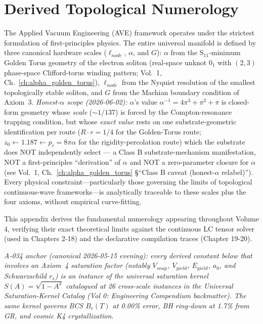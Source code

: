 \chapter{Derived Topological Numerology}
\label{app:derived_topological_numerology}

The Applied Vacuum Engineering (AVE) framework operates under the strictest formulation of first-principles physics. The entire universal manifold is defined by three canonical hardware scales ($\ell_{node}$, $\alpha$, and $G$): $\alpha$ from the S$_{11}$-minimum Golden Torus geometry of the electron soliton (real-space unknot $0_1$ with $(2,3)$ phase-space Clifford-torus winding pattern; Vol.~1, Ch.~\ref{ch:alpha_golden_torus}), $\ell_{node}$ from the Nyquist resolution of the smallest topologically stable soliton, and $G$ from the Machian boundary condition of Axiom~3. \emph{Honest-$\alpha$ scope (2026-06-02):} $\alpha$'s value $\alpha^{-1} = 4\pi^3 + \pi^2 + \pi$ is closed-form geometry whose \emph{scale} ($\sim 1/137$) is forced by the Compton-resonance trapping condition, but whose \emph{exact value} rests on one substrate-geometric identification per route ($R \cdot r = 1/4$ for the Golden-Torus route; $z_0 \leftarrow 1.187 \leftarrow p_c = 8\pi\alpha$ for the rigidity-percolation route) which the substrate does NOT independently select --- a Class B substrate-mechanism manifestation, NOT a first-principles ``derivation'' of $\alpha$ and NOT a zero-parameter closure for $\alpha$ (see Vol.~1, Ch.~\ref{ch:alpha_golden_torus} \S``Class B caveat (honest-$\alpha$ relabel)''). Every physical constraint---particularly those governing the limits of topological continuous-wave frameworks---is analytically traceable to these scales plus the four axioms, without empirical curve-fitting.

This appendix derives the fundamental numerology appearing throughout Volume 4, verifying their exact theoretical limits against the continuous LC tensor solver (used in Chapters 2-18) and the declarative compilation traces (Chapter 19-20).

\textit{A-034 anchor (canonical 2026-05-15 evening): every derived constant below that involves an Axiom~4 saturation factor (notably $V_{snap}$, $V_{yield}$, $E_{yield}$, $a_0$, and Schwarzschild $r_s$) is an instance of the universal saturation kernel $S(A) = \sqrt{1-A^2}$ catalogued at 26 cross-scale instances in the Universal Saturation-Kernel Catalog (Vol 0: Engineering Compendium backmatter). The same kernel governs BCS $B_c(T)$ at 0.00\% error, BH ring-down at 1.7\% from GR, and cosmic K4 crystallization.}

